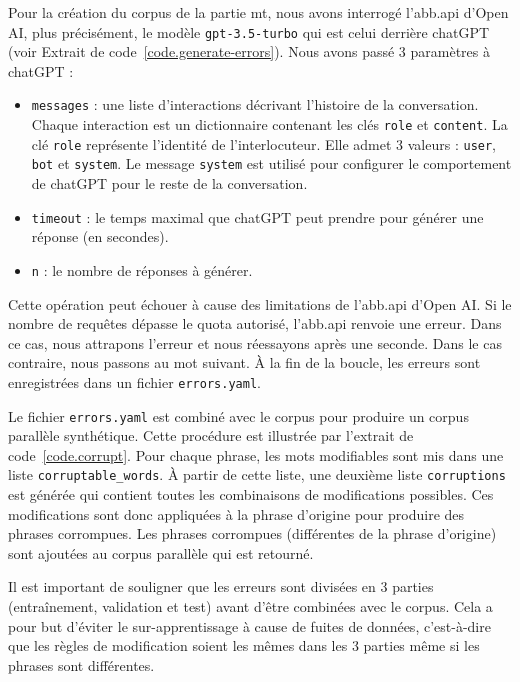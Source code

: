 Pour la création du corpus de la partie \gls{mt},
nous avons interrogé l'\gls{abb.api} d'\foreignlanguage{english}{Open AI}, 
plus précisément, le modèle \verb|gpt-3.5-turbo| qui est celui derrière chatGPT
(voir Extrait de code~\ref{code.generate-errors}).
Nous avons passé 3 paramètres à chatGPT :
\begin{itemize}
    \item \verb|messages| : une liste d'interactions décrivant l'histoire de la conversation.
    Chaque interaction est un dictionnaire contenant les clés \verb|role| et \verb|content|.
    La clé \verb|role| représente l'identité de l'interlocuteur.
    Elle admet 3 valeurs : \verb|user|, \verb|bot| et \verb|system|.
    Le message \verb|system| est utilisé pour configurer le comportement de chatGPT pour le reste de la conversation.
    \item \verb|timeout| : le temps maximal que chatGPT peut prendre pour générer une réponse (en secondes).
    \item \verb|n| : le nombre de réponses à générer.
\end{itemize}
Cette opération peut échouer à cause des limitations de l'\gls{abb.api} d'\foreignlanguage{english}{Open AI}.
Si le nombre de requêtes dépasse le quota autorisé, l'\gls{abb.api} renvoie une erreur.
Dans ce cas, nous attrapons l'erreur et nous réessayons après une seconde.
Dans le cas contraire, nous passons au mot suivant.
À la fin de la boucle, les erreurs sont enregistrées dans un fichier \verb|errors.yaml|.



Le fichier \verb|errors.yaml| est combiné avec le corpus pour produire un corpus parallèle synthétique.
Cette procédure est illustrée par l'extrait de code~\ref{code.corrupt}.
Pour chaque phrase, les mots modifiables sont mis dans une liste \verb|corruptable_words|.
À partir de cette liste, une deuxième liste \verb|corruptions| est générée qui contient 
toutes les combinaisons de modifications possibles.
Ces modifications sont donc appliquées à la phrase d'origine pour produire des phrases corrompues.
Les phrases corrompues (différentes de la phrase d'origine) sont ajoutées au corpus parallèle qui est retourné.



Il est important de souligner que les erreurs sont  divisées en 3 parties 
(entraînement, validation et test) avant d'être combinées avec le corpus.
Cela a pour but d'éviter le sur-apprentissage à cause de fuites de données,
c'est-à-dire que les règles de modification soient les mêmes dans les 3 parties
même si les phrases sont différentes.